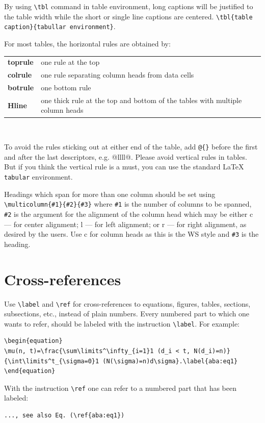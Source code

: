 \documentclass{ws-ijbc}
\begin{document}
By using \verb|\tbl| command in table environment, long captions will be justified to the table width while the short or single line captions are centered.
\verb|\tbl{table caption}{tabullar environment}|.

For most tables, the horizontal rules are obtained by:

\begin{tabular}{ll}
{\bf toprule} & one rule at the top\\
{\bf colrule}& one rule separating column heads from data cells\\
{\bf botrule}& one bottom rule\\
{\bf Hline} & one thick rule at the top and bottom of the tables with multiple column heads\\
\end{tabular}

\

To avoid the rules sticking out at either end
of the table, add \verb|@{}| before the first and after the last descriptors, e.g.
{@{}llll@{}}. Please avoid vertical rules in tables.
But if you think the vertical rule is a must,
you can use the standard \LaTeX{} \verb|tabular| environment.

Headings which span for more than one column should be set using
\verb|\multicolumn{#1}{#2}{#3}| where \verb|#1| is the number of
columns to be spanned, \verb|#2| is the argument for the alignment
of the column head which may be either {c} --- for center
alignment; {l} --- for left alignment; or {r} --- for right
alignment, as desired by the users. Use {c} for column heads as
this is the WS style and \verb|#3| is the heading.

\section{Cross-references}
Use \verb|\label| and \verb|\ref| for cross-references to
equations, figures, tables, sections, subsections, etc., instead
of plain numbers. Every numbered part to which one wants to refer,
should be labeled with the instruction \verb|\label|.
For example:
\begin{verbatim}
\begin{equation}
\mu(n, t)=\frac{\sum\limits^\infty_{i=1}1 (d_i < t, N(d_i)=n)}
{\int\limits^t_{\sigma=0}1 (N(\sigma)=n)d\sigma}.\label{aba:eq1}
\end{equation}
\end{verbatim}
With the instruction \verb|\ref| one can refer to a numbered part
that has been labeled:
\begin{verbatim}
..., see also Eq. (\ref{aba:eq1})
\end{verbatim}
\end{document}
